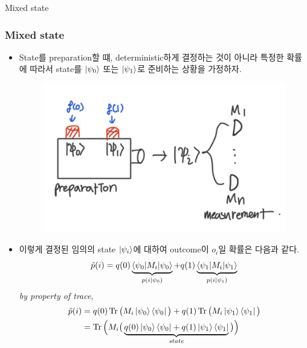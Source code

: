 \documentclass[9pt]{beamer}
\begin{document}
\begin{section}{Mixed state}
        \begin{frame}
            \frametitle{Mixed state}
            \begin{itemize}
                \item State를 preparation할 떄, deterministic하게 결정하는 것이 아니라 특정한 확률에 따라서 state를 $\ket{\psi_0}$ 또는 $\ket{\psi_1}$로 준비하는 상황을 가정하자.
                \begin{figure}
                    \includegraphics[width=0.4\columnwidth]{image/L1_mixed_experiment.png}
                \end{figure}
                \item 이렇게 결정된 임의의 state $\ket{\psi_i}$에 대하여 outcome이 $o_i$일 확률은 다음과 같다.
                $$ \tilde{p}(i) = q(0) \underbrace{\braket{\psi_0 |M_i| \psi_0}}_{p(i|\psi_0)} + q(1) \underbrace{\braket{\psi_1 |M_i| \psi_1}}_{p(i|\psi_1)} $$
                \textit{by property of trace},
                \begin{align*}\tilde{p}(i) &= q(0) \operatorname{Tr}\big(M_i \ket{\psi_0} \bra{\psi_0}\big) + q(1)\operatorname{Tr}\big( M_i \ket{\psi_1} \bra{\psi_1}\big) \\ &= \operatorname{Tr} \Big(M_i  \big( \underbrace{q(0) \ket {\psi_0} \bra {\psi_0} + q(1) \ket {\psi_1} \bra {\psi_1}}_{state} \big)\Big)\end{align*}
            \end{itemize}
        \end{frame}


\end{section}
\end{document}
